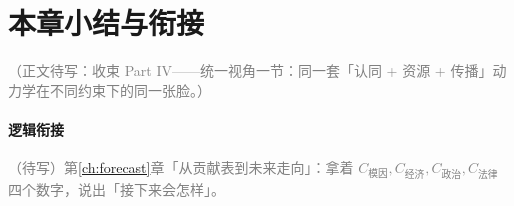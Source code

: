 \documentclass[../../main2.tex]{subfiles}
\begin{document}
	\section{本章小结与衔接}
	\label{sec:law-summary}

	\textcolor{gray}{（正文待写：收束 Part IV——统一视角一节：同一套「认同 + 资源 + 传播」动力学在不同约束下的同一张脸。）}

	\paragraph*{逻辑衔接}
	\textcolor{gray}{（待写）第\ref{ch:forecast}章「从贡献表到未来走向」：拿着 $C_{\text{模因}}, C_{\text{经济}}, C_{\text{政治}}, C_{\text{法律}}$ 四个数字，说出「接下来会怎样」。}
\end{document}
